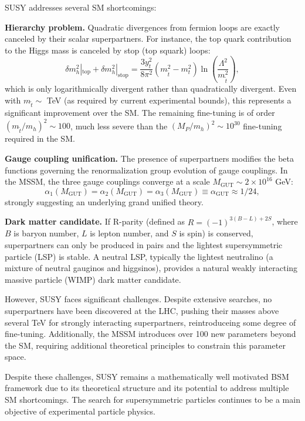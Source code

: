SUSY addresses several SM shortcomings:

\textbf{Hierarchy problem.} Quadratic divergences from fermion loops are exactly canceled by their scalar superpartners. For instance, the top quark contribution to the Higgs mass is canceled by stop (top squark) loops:
\begin{equation}
\delta m_h^2|_{\text{top}} + \delta m_h^2|_{\text{stop}} = \frac{3y_t^2}{8\pi^2} \left( m_{\tilde{t}}^2 - m_t^2 \right) \ln\left(\frac{\Lambda^2}{m_{\tilde{t}}^2}\right),
\end{equation}
which is only logarithmically divergent rather than quadratically divergent. Even with $m_{\tilde{t}} \sim$ TeV (as required by current experimental bounds), this represents a significant improvement over the SM. The remaining fine-tuning is of order $(m_{\tilde{t}}/m_h)^2 \sim 100$, much less severe than the $(M_P/m_h)^2 \sim 10^{30}$ fine-tuning required in the SM.

\textbf{Gauge coupling unification.} The presence of superpartners modifies the beta functions governing the renormalization group evolution of gauge couplings. In the MSSM, the three gauge couplings converge at a scale $M_{\text{GUT}} \sim 2 \times 10^{16}$ GeV:
\begin{equation}
\alpha_1(M_{\text{GUT}}) = \alpha_2(M_{\text{GUT}}) = \alpha_3(M_{\text{GUT}}) \equiv \alpha_{\text{GUT}} \approx 1/24,
\end{equation}
strongly suggesting an underlying grand unified theory.

\textbf{Dark matter candidate.} If R-parity (defined as $R = (-1)^{3(B-L)+2S}$, where $B$ is baryon number, $L$ is lepton number, and $S$ is spin) is conserved, superpartners can only be produced in pairs and the lightest supersymmetric particle (LSP) is stable. A neutral LSP, typically the lightest neutralino (a mixture of neutral gauginos and higgsinos), provides a natural weakly interacting massive particle (WIMP) dark matter candidate.

However, SUSY faces significant challenges. Despite extensive searches, no superpartners have been discovered at the LHC, pushing their masses above several TeV for strongly interacting superpartners, reintroduceing some degree of fine-tuning. Additionally, the MSSM introduces over 100 new parameters beyond the SM, requiring additional theoretical principles to constrain this parameter space.

Despite these challenges, SUSY remains a mathematically well motivated BSM framework due to its theoretical structure and its potential to address multiple SM shortcomings. The search for supersymmetric particles continues to be a main objective of experimental particle physics.




